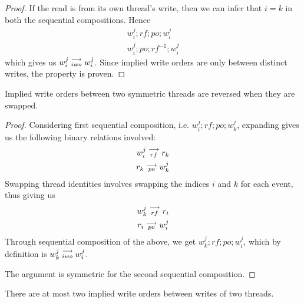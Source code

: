     \begin{proof}
        If the read is from its own thread's write, then we can infer that $i=k$ in both the sequential compositions. Hence  
        \begin{align*}
            w_i^j;rf;po;w_i^j \\
            w_i^j;po;rf^{-1};w_i^j
        \end{align*} 
        which gives us $w_i^j\stackrel{\longrightarrow}{_{iwo}}w_i^j$.
        Since implied write orders are only between distinct writes, the property is proven.  
    \end{proof}
        

    \begin{property}
        Implied write orders between two symmetric threads are reversed when they are swapped.
    \end{property}
        
    \begin{proof}
        Considering first sequential composition, i.e. $w_i^j;rf;po;w_k^j$, expanding gives us the following binary relations involved:
        \begin{align}
            w_i^j\stackrel{\longrightarrow}{_{rf}}r_k \\
            r_k\stackrel{\longrightarrow}{_{po}}w_k^j
        \end{align}
        Swapping thread identities involves swapping the indices $i$ and $k$ for each event, thus giving us 
        \begin{align}
            w_k^j\stackrel{\longrightarrow}{_{rf}}r_i \\
            r_i\stackrel{\longrightarrow}{_{po}}w_i^j
        \end{align}
        Through sequential composition of the above, we get $w_k^j;rf;po;w_i^j$, which by definition is $w_k^j\stackrel{\longrightarrow}{_{iwo}}w_i^j$.

        The argument is symmetric for the second sequential composition. 
    \end{proof}
        

    \begin{property}
        There are at most two implied write orders between writes of two threads.
    \end{property}
        

